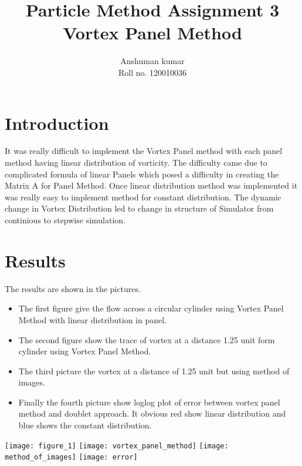 \documentclass[12pt]{article}
\title {Particle Method Assignment 3 \\
Vortex Panel Method }
\author {Anshuman kumar \\
Roll no.  120010036}
\begin{document}
\maketitle

\section{Introduction}
It was really difficult to implement the Vortex Panel method with each panel method having linear distribution
of vorticity. The difficulty came due to complicated formula of linear Panels which posed a difficulty in creating
the Matrix A for Panel Method. Once linear distribution method was implemented it was really easy to implement method
for constant distribution. The dynamic change in Vortex Distribution led to change in structure of Simulator from continious
to stepwise simulation.

\section{Results}
        The results are shown in the pictures. 
\begin{itemize}
    \item The first figure give the flow 
        across a circular cylinder using Vortex Panel Method with linear distribution in panel.
    \item The second figure show the trace of vortex at a distance 1.25 unit form cylinder using Vortex Panel Method.
    \item The third picture the vortex at a distance of 1.25 unit but using method of images.
    \item Finally the fourth picture show loglog plot of error between vortex panel method and doublet approach. It obvious red show linear distribution and blue shows the constant distribution.
\end{itemize}
\texttt{[image: figure\_1]}
\texttt{[image: vortex\_panel\_method]}
\texttt{[image: method\_of\_images]}
\texttt{[image: error]}
\end{document}
